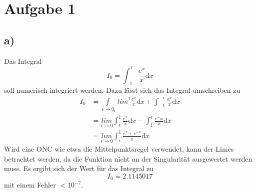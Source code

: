 \section*{Aufgabe 1}
\subsection*{a)} 
Das Integral
\[
I_0 = \int_{-1}^1 \frac{e^x}{x}\mathrm{d}x
\]
soll numerisch integriert werden.
Dazu lässt sich das Integral umschreiben zu
\begin{align*}
I_0 &= \underset{\epsilon\rightarrow 0}\int_{\epsilon}{lim}^1\frac{e^x}{x}\mathrm{d}x + \int_{-1}^{-\epsilon}\frac{e^x}{x}\mathrm{d}x\\
&=\underset{\epsilon\rightarrow 0}{lim}\int_{\epsilon}^1\frac{e^x}{x}\mathrm{d}x - \int_{1}^{\epsilon}\frac{e^-x}{x}\mathrm{d}x\\
&=\underset{\epsilon\rightarrow 0}{lim}\int_{\epsilon}^1\frac{e^x+e^{-x}}{x}\mathrm{d}x
\end{align*}
Wird eine ONC wie etwa die Mittelpunktsregel verwendet, kann der Limes betrachtet werden, da die Funktion nicht an der Singularität ausgewertet werden muss. Es ergibt sich der Wert für das Integral zu
\[
I_0 = 2.1145017
\]
mit einem Fehler $<10^{-7}$.

